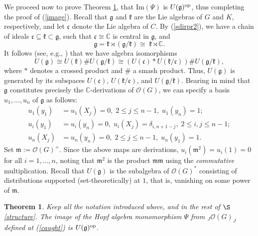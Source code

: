 \documentclass{amsart}
\numberwithin{equation}{section}
\newtheorem{theorem}{Theorem}[section]
\theoremstyle{definition}
\begin{document}
We proceed now to prove Theorem \ref{noethdomminunip2}, that $\mathrm{Im}(\Psi)$ is $U(\mathfrak{g})^{{\rm op}}$, thus completing the  proof of  (\ref{image}). Recall that $\mathfrak{g}$ and $\mathfrak{k}$ are  the Lie algebras of $G$ and $K$, respectively, and let $\mathfrak{c}$ denote the Lie algebra of $C$. By (\ref{sdirpr2}), we have a chain of ideals $\mathfrak{c}\subseteq \mathfrak{k}\subset \mathfrak{g}$, 
such that $\mathfrak{c}\cong \mathbb{C}$ is central in $\mathfrak{g}$, and 
\begin{equation*}\label{sdirprlie2}
\mathfrak{g}=\mathfrak{k}\rtimes (\mathfrak{g}/\mathfrak{k})\cong  \; \mathfrak{k}\rtimes \mathbb{C}.
\end{equation*}
It follows (see, e.g., \cite[\S 1.7.10, \S 1.7.12]{McCR}) that we have algebra isomorphisms 
\begin{equation}\label{sdirprlieuniv2}
U(\mathfrak{g})\cong U(\mathfrak{k})\#U(\mathfrak{g}/\mathfrak{k}) \cong \left(U(\mathfrak{c})*U(\mathfrak{k}  /\mathfrak{c})\right)\#U(\mathfrak{g}/\mathfrak{k}),
\end{equation}
where $*$ denotes a crossed product and $\#$ a smash product. Thus, $U(\mathfrak{g})$ is generated by its subspaces $U(\mathfrak{c})$, $U(\mathfrak{k}/\mathfrak{c})$, and $U(\mathfrak{g}/\mathfrak{k})$.  
Bearing in mind that $\mathfrak{g}$ constitutes precisely the $\mathbb{C}$-derivations of $\mathcal{O}(G)$, we can specify a basis $u_1, \ldots  , u_n$ of $\mathfrak{g}$ as follows: 
\begin{align*} u_1(y_1) &= u_1(X_j) = 0, \; 2 \leq j \leq n-1, \; u_1 (y_n) = 1;\\ 
u_i(y_1) &= u_i(y_n) = 0, \; u_i (X_j) = \delta_{i,n+1-j}, \; 2 \leq i,j \leq n-1;\\
u_n(X_j) &= u_n(y_n) = 0, \; 2 \leq j \leq n-1, \; u_n(y_1) = 1.
\end{align*}
Set $\mathfrak{m}:=\mathcal{O}(G)^+$. Since the above maps are derivations,  $u_i(\mathfrak{m}^2) = u_i(1) = 0$ for all $i = 1, \ldots , n$, noting that $\mathfrak{m}^2$ is the product $\mathfrak{m}\mathfrak{m}$ using the \emph{commutative} multiplication. Recall that $U(\mathfrak{g})$ is the subalgebra of $\mathcal{O}(G)^*$ consisting of distributions supported (set-theoretically) at $1$, that is, vanishing on some power of $\mathfrak{m}$.

\begin{theorem}\label{noethdomminunip2}
Keep all the notation introduced above, and in the rest of $\S$\ref{structure}. The image of the Hopf algebra monomorphism $\Psi$ from $_J\mathcal{O}(G)_J$ defined at (\ref{caught}) is $U(\mathfrak{g})^{{\rm op}}$. 
\end{theorem}
\end{document}
